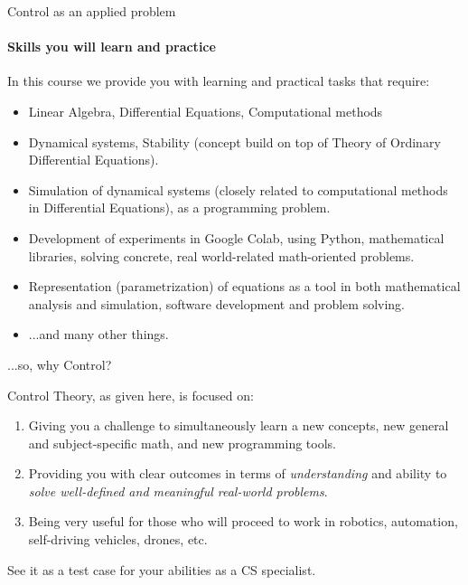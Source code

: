 \documentclass{beamer}
\begin{document}
\begin{frame}{Control as an applied problem}
\framesubtitle{Skills you will learn and practice}
\begin{flushleft}

In this course we provide you with learning and practical tasks that require:

\begin{itemize}
    \item Linear Algebra, Differential Equations, Computational methods
    \item Dynamical systems, Stability (concept build on top of Theory of Ordinary Differential Equations).
    
    \item Simulation of dynamical systems (closely related to computational methods in Differential Equations), as a programming problem.
    \item Development of experiments in Google Colab, using Python, mathematical libraries, solving concrete, real world-related math-oriented problems.
    
    \item Representation (parametrization) of equations as a tool in both mathematical analysis and simulation, software development and problem solving.
    
    \item ...and many other things.
\end{itemize}

\end{flushleft}
\end{frame}


\begin{frame}{...so, why Control?}
\begin{flushleft}

Control Theory, as given here, is focused on:

\begin{enumerate}
    \item Giving you a challenge to simultaneously learn a new concepts, new general and subject-specific math, and new programming tools.
    \item Providing you with clear outcomes in terms of \emph{understanding} and ability to \emph{solve well-defined and meaningful real-world problems}.
    \item Being very useful for those who will proceed to work in robotics, automation, self-driving vehicles, drones, etc.
\end{enumerate}

See it as a test case for your abilities as a CS specialist.

\end{flushleft}
\end{frame}
\end{document}
